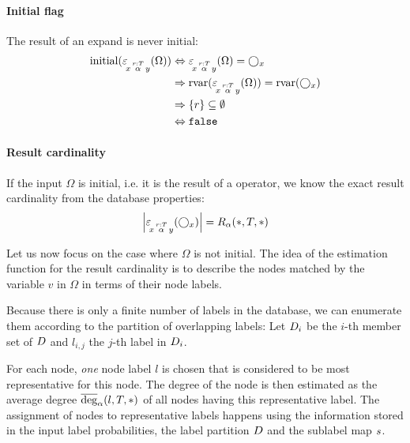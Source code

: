 \paragraph{Initial flag}

The result of an expand is never initial:
\begin{align*}
  \textnormal{initial}(\varepsilon\!_{x\, \overset{r:T}{\alpha} \, y}(\Omega))
    &\Leftrightarrow \varepsilon\!_{x\, \overset{r:T}{\alpha} \, y}(\Omega) = \bigcirc_{x} \\
    &\Rightarrow \textnormal{rvar}(\varepsilon\!_{x\, \overset{r:T}{\alpha} \, y}(\Omega))
                 = \textnormal{rvar}(\bigcirc_{x}) \\
    &\Rightarrow \{ r \} \subseteq \emptyset \\
    &\Leftrightarrow \texttt{false}
\end{align*}

\paragraph{Result cardinality}

If the input $\Omega$ is initial, i.e. it is the result of a 
operator, we know the exact result cardinality from the database properties:
\begin{align}
  {\left \vert \varepsilon\!_{x\, \overset{r:T}{\alpha} \, y}(\bigcirc_{x}) \right \vert} = R_\alpha(*, T, *)
\end{align}

Let us now focus on the case where $\Omega$ is not initial.
The idea of the estimation function for the result cardinality is to
describe the nodes matched by the variable $v$ in $\Omega$
in terms of their node labels.

Because there is only a finite number of labels in the database, we can
enumerate them according to the partition of overlapping labels:
Let $D_i$ be the $i$-th member set of $D$ and
$l_{i,j}$ the $j$-th label in $D_i$.

For each node, \emph{one} node label $l$ is chosen that is considered to be
most representative for this node.
The degree of the node is then estimated as the average degree
$\avgdeg_\alpha(l, T, *)$ of all nodes having this representative label.
The assignment of nodes to representative labels happens using the information
stored in the input label probabilities, the label partition $D$ and the
sublabel map $s$.


